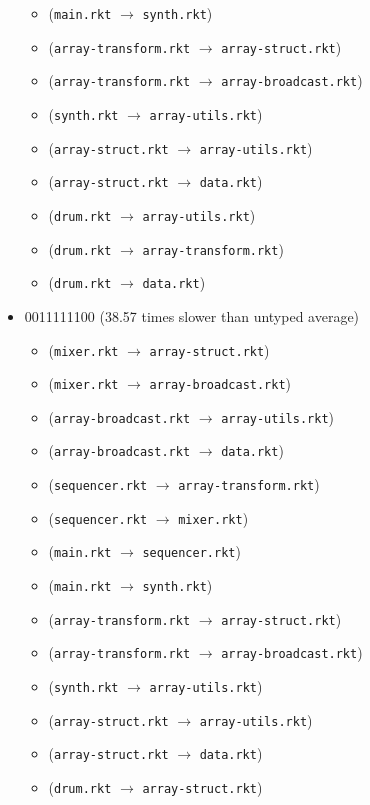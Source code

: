 \documentclass{article}
\newcommand{\mono}[1]{\texttt{#1}}
\begin{document}
\begin{itemize}
\begin{itemize}
  \item (\mono{main.rkt} $\rightarrow$ \mono{synth.rkt})
  \item (\mono{array-transform.rkt} $\rightarrow$ \mono{array-struct.rkt})
  \item (\mono{array-transform.rkt} $\rightarrow$ \mono{array-broadcast.rkt})
  \item (\mono{synth.rkt} $\rightarrow$ \mono{array-utils.rkt})
  \item (\mono{array-struct.rkt} $\rightarrow$ \mono{array-utils.rkt})
  \item (\mono{array-struct.rkt} $\rightarrow$ \mono{data.rkt})
  \item (\mono{drum.rkt} $\rightarrow$ \mono{array-utils.rkt})
  \item (\mono{drum.rkt} $\rightarrow$ \mono{array-transform.rkt})
  \item (\mono{drum.rkt} $\rightarrow$ \mono{data.rkt})
  \end{itemize}
\item 0011111100 (38.57 times slower than untyped average)
  \begin{itemize}
  \item (\mono{mixer.rkt} $\rightarrow$ \mono{array-struct.rkt})
  \item (\mono{mixer.rkt} $\rightarrow$ \mono{array-broadcast.rkt})
  \item (\mono{array-broadcast.rkt} $\rightarrow$ \mono{array-utils.rkt})
  \item (\mono{array-broadcast.rkt} $\rightarrow$ \mono{data.rkt})
  \item (\mono{sequencer.rkt} $\rightarrow$ \mono{array-transform.rkt})
  \item (\mono{sequencer.rkt} $\rightarrow$ \mono{mixer.rkt})
  \item (\mono{main.rkt} $\rightarrow$ \mono{sequencer.rkt})
  \item (\mono{main.rkt} $\rightarrow$ \mono{synth.rkt})
  \item (\mono{array-transform.rkt} $\rightarrow$ \mono{array-struct.rkt})
  \item (\mono{array-transform.rkt} $\rightarrow$ \mono{array-broadcast.rkt})
  \item (\mono{synth.rkt} $\rightarrow$ \mono{array-utils.rkt})
  \item (\mono{array-struct.rkt} $\rightarrow$ \mono{array-utils.rkt})
  \item (\mono{array-struct.rkt} $\rightarrow$ \mono{data.rkt})
  \item (\mono{drum.rkt} $\rightarrow$ \mono{array-struct.rkt})

\end{itemize}
\end{itemize}
\end{document}

